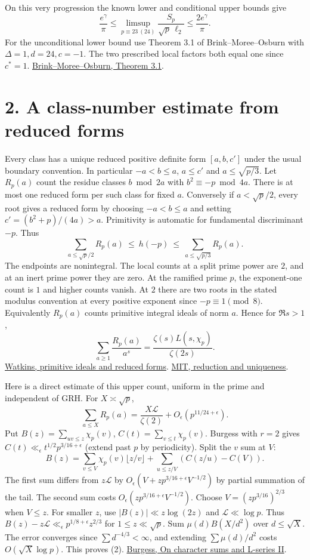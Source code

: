 \documentclass[11pt]{article}
\newcommand{\LL}{\mathcal L}
\newcommand{\ch}{\chi_p}
\begin{document}
On this very progression the known lower and conditional upper bounds give
\[
 \frac{e^\gamma}{\pi}\le
 \limsup_{p\equiv23\ (24)}\frac{S_p}{\sqrt p\,\ell_2}
 \le\frac{2e^\gamma}{\pi}.
\]
For the unconditional lower bound use Theorem 3.1 of Brink--Moree--Osburn with $\Delta=1,d=24,c=-1$. The two prescribed local factors both equal one since $c^*=1$. \href{https://arxiv.org/pdf/1003.1094}{Brink--Moree--Osburn, Theorem 3.1}.

\newpage
\section*{2. A class-number estimate from reduced forms}
Every class has a unique reduced positive definite form $[a,b,c']$ under the usual boundary convention. In particular $-a<b\le a$, $a\le c'$ and $a\le\sqrt{p/3}$. Let $R_p(a)$ count the residue classes $b\bmod 2a$ with $b^2\equiv-p\bmod 4a$. There is at most one reduced form per such class for fixed $a$. Conversely if $a<\sqrt p/2$, every root gives a reduced form by choosing $-a<b\le a$ and setting $c'=(b^2+p)/(4a)>a$. Primitivity is automatic for fundamental discriminant $-p$. Thus
\[
 \sum_{a\le\sqrt p/2}R_p(a)\ \le\ h(-p)\ \le\ \sum_{a\le\sqrt{p/3}}R_p(a).
\]
The endpoints are nonintegral. The local counts at a split prime power are $2$, and at an inert prime power they are zero. At the ramified prime $p$, the exponent-one count is $1$ and higher counts vanish. At $2$ there are two roots in the stated modulus convention at every positive exponent since $-p\equiv1\pmod8$. Equivalently $R_p(a)$ counts primitive integral ideals of norm $a$. Hence for $\Re s>1$,
\[
 \sum_{a\ge1}\frac{R_p(a)}{a^s}
       =\frac{\zeta(s)L(s,\ch)}{\zeta(2s)}.
\]
\href{https://magma.maths.usyd.edu.au/~watkins/papers/ALTMERGE15.pdf}{Watkins, primitive ideals and reduced forms}. \href{https://math.mit.edu/classes/18.785/2019fa/ProblemSet7.pdf}{MIT, reduction and uniqueness}.

Here is a direct estimate of this upper count, uniform in the prime and independent of GRH. For $X\asymp\sqrt p$,
\begin{equation}
 \sum_{a\le X}R_p(a)=\frac{X\LL}{\zeta(2)}
                       +O_\epsilon(p^{11/24+\epsilon}).
\end{equation}
Put $B(z)=\sum_{uv\le z}\ch(v)$, $C(t)=\sum_{v\le t}\ch(v)$. Burgess with $r=2$ gives $C(t)\ll_\epsilon t^{1/2}p^{3/16+\epsilon}$ (extend past $p$ by periodicity). Split the $v$ sum at $V$:
\[
 B(z)=\sum_{v\le V}\ch(v)\lfloor z/v\rfloor+
                \sum_{u\le z/V}(C(z/u)-C(V)).
\]
The first sum differs from $z\LL$ by $O_\epsilon(V+zp^{3/16+\epsilon}V^{-1/2})$ by partial summation of the tail. The second sum costs $O_\epsilon(zp^{3/16+\epsilon}V^{-1/2})$. Choose $V=(zp^{3/16})^{2/3}$ when $V\le z$. For smaller $z$, use $|B(z)|\ll z\log(2z)$ and $\LL\ll\log p$. Thus $B(z)-z\LL\ll_\epsilon p^{1/8+\epsilon}z^{2/3}$ for $1\le z\ll\sqrt p$. Sum $\mu(d)B(X/d^2)$ over $d\le\sqrt X$. The error converges since $\sum d^{-4/3}<\infty$, and extending $\sum\mu(d)/d^2$ costs $O(\sqrt X\log p)$. This proves (2). \href{https://doi.org/10.1112/plms/s3-13.1.524}{Burgess, On character sums and L-series II}.
\end{document}
